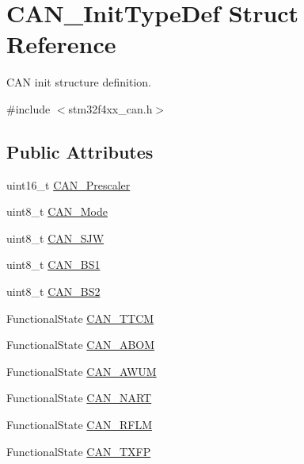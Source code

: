 \hypertarget{struct_c_a_n___init_type_def}{}\section{C\+A\+N\+\_\+\+Init\+Type\+Def Struct Reference}
\label{struct_c_a_n___init_type_def}


C\+A\+N init structure definition.  




{\ttfamily \#include $<$stm32f4xx\+\_\+can.\+h$>$}

\subsection*{Public Attributes}
\begin{DoxyCompactItemize}
\item 
uint16\+\_\+t \hyperlink{struct_c_a_n___init_type_def_a3e91dbcbf30b893a9bd6a65606cb8fe9}{C\+A\+N\+\_\+\+Prescaler}
\item 
uint8\+\_\+t \hyperlink{struct_c_a_n___init_type_def_a24816ff18ae048a5ec4bbb22aa2c04f9}{C\+A\+N\+\_\+\+Mode}
\item 
uint8\+\_\+t \hyperlink{struct_c_a_n___init_type_def_addac271c43490cb37ac7293f7bf201c2}{C\+A\+N\+\_\+\+S\+J\+W}
\item 
uint8\+\_\+t \hyperlink{struct_c_a_n___init_type_def_aecbd21b55dc88c3a18db93af2836cd58}{C\+A\+N\+\_\+\+B\+S1}
\item 
uint8\+\_\+t \hyperlink{struct_c_a_n___init_type_def_a693eb00830d6e2aeb4d9fabdba85b9cf}{C\+A\+N\+\_\+\+B\+S2}
\item 
Functional\+State \hyperlink{struct_c_a_n___init_type_def_aa53ceafdcf1a9a5c9a6566006c9a4b60}{C\+A\+N\+\_\+\+T\+T\+C\+M}
\item 
Functional\+State \hyperlink{struct_c_a_n___init_type_def_a70560646c27d96ca8adc4a62d24dafd9}{C\+A\+N\+\_\+\+A\+B\+O\+M}
\item 
Functional\+State \hyperlink{struct_c_a_n___init_type_def_a10f873c858a7b0efc2d0ab41524320d3}{C\+A\+N\+\_\+\+A\+W\+U\+M}
\item 
Functional\+State \hyperlink{struct_c_a_n___init_type_def_a5adeac1b7b47f2b91e667eddc181ac09}{C\+A\+N\+\_\+\+N\+A\+R\+T}
\item 
Functional\+State \hyperlink{struct_c_a_n___init_type_def_aa63787683c0ad533b513fb60355d76f1}{C\+A\+N\+\_\+\+R\+F\+L\+M}
\item 
Functional\+State \hyperlink{struct_c_a_n___init_type_def_a003de4b70fc93b4f820f320c6ea75a16}{C\+A\+N\+\_\+\+T\+X\+F\+P}
\end{DoxyCompactItemize}


